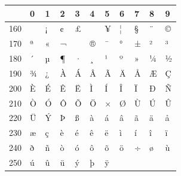 \documentclass[a4paper]{article}
\newlength{\DUtablewidth} %
\begin{document}
\leavevmode
\setlength{\DUtablewidth}{\linewidth}
\begin{longtable}[c]{|p{0.051\DUtablewidth}|p{0.028\DUtablewidth}|p{0.028\DUtablewidth}|p{0.028\DUtablewidth}|p{0.028\DUtablewidth}|p{0.028\DUtablewidth}|p{0.028\DUtablewidth}|p{0.028\DUtablewidth}|p{0.028\DUtablewidth}|p{0.028\DUtablewidth}|p{0.028\DUtablewidth}|}
\hline

% 
 & 
0
 & 
1
 & 
2
 & 
3
 & 
4
 & 
5
 & 
6
 & 
7
 & 
8
 & 
9
 \\
\hline

160
 &  & 
¡
 & 
¢
 & 
£
 &  & 
¥
 & 
¦
 & 
§
 & 
¨
 & 
©
 \\
\hline

170
 & 
ª
 & 
«
 & 
¬
 & 
\-
 & 
®
 & 
¯
 & 
°
 & 
±
 & 
²
 & 
³
 \\
\hline

180
 & 
´
 & 
µ
 & 
¶
 & 
·
 & 
¸
 & 
¹
 & 
º
 & 
»
 & 
¼
 & 
½
 \\
\hline

190
 & 
¾
 & 
¿
 & 
À
 & 
Á
 & 
Â
 & 
Ã
 & 
Ä
 & 
Å
 & 
Æ
 & 
Ç
 \\
\hline

200
 & 
È
 & 
É
 & 
Ê
 & 
Ë
 & 
Ì
 & 
Í
 & 
Î
 & 
Ï
 & 
Ð
 & 
Ñ
 \\
\hline

210
 & 
Ò
 & 
Ó
 & 
Ô
 & 
Õ
 & 
Ö
 & 
×
 & 
Ø
 & 
Ù
 & 
Ú
 & 
Û
 \\
\hline

220
 & 
Ü
 & 
Ý
 & 
Þ
 & 
ß
 & 
à
 & 
á
 & 
â
 & 
ã
 & 
ä
 & 
å
 \\
\hline

230
 & 
æ
 & 
ç
 & 
è
 & 
é
 & 
ê
 & 
ë
 & 
ì
 & 
í
 & 
î
 & 
ï
 \\
\hline

240
 & 
ð
 & 
ñ
 & 
ò
 & 
ó
 & 
ô
 & 
õ
 & 
ö
 & 
÷
 & 
ø
 & 
ù
 \\
\hline

250
 & 
ú
 & 
û
 & 
ü
 & 
ý
 & 
þ
 & 
ÿ
 &  &  &  &  \\
\hline
\end{longtable}
%
\end{document}
